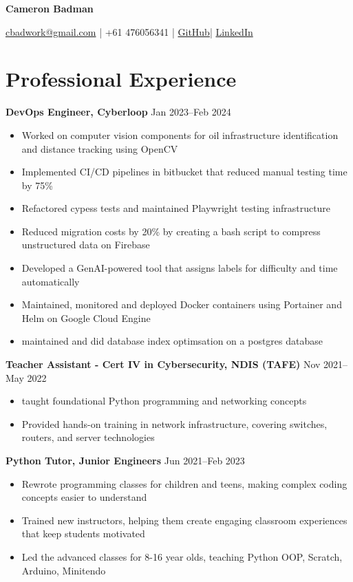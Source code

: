 \documentclass[10pt,a4paper]{article}
\begin{document}
	\begin{center}
		{\huge\textbf{Cameron Badman}}
		\begin{center}
			\href{mailto:cbadwork@gmail.com}{cbadwork@gmail.com} |
			+61 476056341 |
			\href{https://github.com/CameronBadman}{GitHub}| 
			\href{https://www.linkedin.com/in/cameron-badman-5314ba1b8/}{LinkedIn}
		\end{center}
	\end{center}
	
	\section{Professional Experience}
	\textbf{DevOps Engineer, Cyberloop} \hfill Jan 2023--Feb 2024 
	\begin{itemize}[label=\textbullet, itemsep=0.05cm]
		\item Worked on computer vision components for oil infrastructure identification and distance tracking using OpenCV
		\item Implemented CI/CD pipelines in bitbucket that reduced manual testing time by 75\%
		\item Refactored cypess tests and maintained Playwright testing infrastructure 
		\item Reduced migration costs by 20\% by creating a bash script to compress unstructured data on Firebase
		\item Developed a GenAI-powered tool that assigns labels for difficulty and time automatically
		\item Maintained, monitored and deployed Docker containers using Portainer and Helm on Google Cloud Engine
		\item maintained and did database index optimsation on a postgres database
	\end{itemize}
	\vspace{0.1cm}
	
	\textbf{Teacher Assistant - Cert IV in Cybersecurity, NDIS (TAFE)} \hfill Nov 2021--May 2022 
	\begin{itemize}[label=\textbullet, itemsep=0.05cm]
		\item taught foundational Python programming and networking concepts
		\item Provided hands-on training in network infrastructure, covering switches, routers, and server technologies
	\end{itemize}
	\vspace{0.1cm}
	
	\textbf{Python Tutor, Junior Engineers} \hfill Jun 2021--Feb 2023 
	\begin{itemize}[label=\textbullet, itemsep=0.05cm]
		\item Rewrote programming classes for children and teens, making complex coding concepts easier to understand
		\item Trained new instructors, helping them create engaging classroom experiences that keep students motivated
		\item Led the advanced classes for 8-16 year olds, teaching Python OOP, Scratch, Arduino, Minitendo
	\end{itemize}
	\vspace{0.1cm}
	
\end{document}
